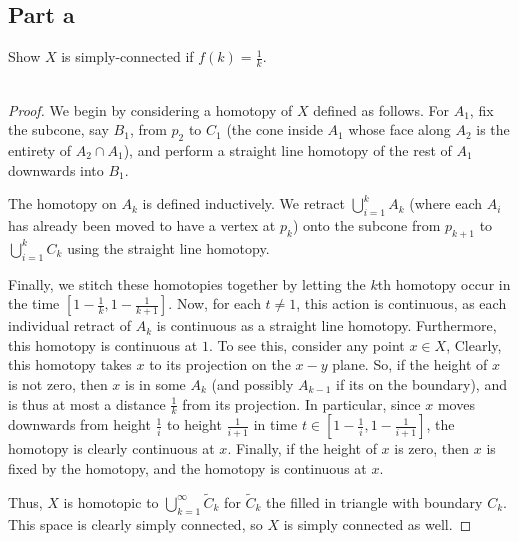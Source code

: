 \documentclass[fontsize=11pt]{scrartcl} %
\numberwithin{equation}{section} %
\numberwithin{figure}{section} %
\numberwithin{table}{section} %
\begin{document}
\subsection*{Part a}
Show $X$ is simply-connected if $f(k)=\frac{1}{k}$.
\\
\\
\begin{proof}
    We begin by considering a homotopy of $X$ defined as follows. For $A_1$, fix
    the subcone, say $B_1$, from $p_2$ to $C_1$ (the cone inside $A_1$ whose face along
    $A_2$ is the entirety of $A_2\cap A_1$), and perform a straight line
    homotopy of the rest of $A_1$ downwards into $B_1$. 

    The homotopy on $A_k$ is defined inductively. We retract $\bigcup_{i=1}^k
    A_k$ (where each $A_i$ has already been moved to have a vertex at $p_k$)
    onto the subcone from $p_{k+1}$ to $\bigcup_{i=1}^k C_k$ using the straight
    line homotopy.

    Finally, we stitch these homotopies together by letting the $k$th homotopy
    occur in the time $[1-\frac{1}{k}, 1-\frac{1}{k+1}]$. Now, for each $t\neq
    1$, this action is continuous, as each individual retract of $A_k$ is
    continuous as a straight line homotopy. Furthermore, this homotopy is
    continuous at $1$. To see this, consider any point $x\in X$, Clearly, this
    homotopy takes $x$ to its projection on the $x-y$ plane. So, if the height
    of $x$ is not zero,
    then $x$ is in some $A_k$ (and possibly $A_{k-1}$ if its on the boundary),
    and is thus at most a distance $\frac{1}{k}$ from its projection. In
    particular, since $x$ moves downwards from height $\frac{1}{i}$ to height
    $\frac{1}{i+1}$ in time $t\in [1-\frac{1}{i},1-\frac{1}{i+1}]$, the homotopy
    is clearly continuous at $x$. Finally, if the height of $x$ is zero, then
    $x$ is fixed by the homotopy, and the homotopy is continuous at $x$.

    Thus, $X$ is homotopic to $\bigcup_{k=1}^{\infty}\tilde{C}_k$ for
    $\tilde{C}_k$ the filled in triangle with boundary $C_k$. This space is
    clearly simply connected, so $X$ is simply connected as well.
\end{proof}

\newpage
\end{document}
